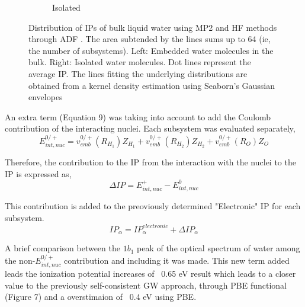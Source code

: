 \documentclass[12pt,a4paper]{article}
\begin{document}
\begin{figure}[!ht]
\begin{subfigure}{0.4\linewidth}
                \caption{Isolated}
        \end{subfigure}
        \caption{Distribution of IPs of bulk liquid water using MP2 and HF methods through ADF \cite{te2001chemistry}. The area subtended by the lines sums up to 64 (ie, the number of subsystems). Left: Embedded water molecules in the bulk. Right: Isolated water molecules. Dot lines represent the average IP. The lines fitting the underlying distributions are obtained from a kernel density estimation using Seaborn's Gaussian envelopes\cite{waskom2017c}}
\end{figure}

An extra term (Equation 9) was taking into account to add the Coulomb contribution of the interacting nuclei. Each subsystem was evaluated
separately, \\

\begin{equation}
        E_{int,nuc}^{0/+}=v_{emb}^{0/+}(R_{H_1}) Z_{H_1} + v_{emb}^{0/+}(R_{H_2}) Z_{H_2} + v_{emb}^{0/+}(R_{O}) Z_{O}
\end{equation}

Therefore, the contribution to the IP from the interaction with the nuclei to the IP is expressed as, \\

\begin{equation}
        \Delta IP = E_{int,nuc}^{+} - E_{int,nuc}^{0}
\end{equation}

This contribution is added to the preoviously determined "Electronic" IP for each subsystem. \\

\begin{equation}
IP_\alpha = IP^{electronic}_\alpha + \Delta IP_\alpha
\end{equation}

A brief comparison between the $1b_{1}$ peak of the optical spectrum of water among the non-$E_{int,nuc}^{0/+}$ contribution and including it
was made. This new term added leads the ionization potential increases of ~0.65 eV result which leads to a closer value to
the previously self-consistent GW approach, through PBE functional (Figure 7) and a overstimaion of ~0.4 eV using PBE. \\
\end{document}
